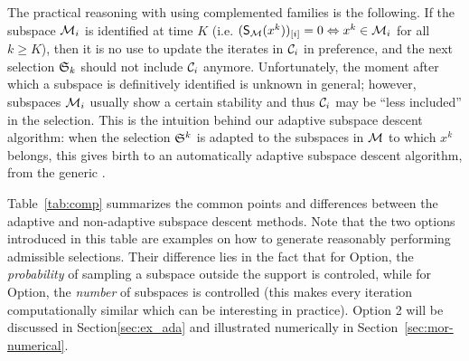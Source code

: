 \smallskip

The practical reasoning with using {complemented} families is the following. If the subspace $\mathcal{M}_i$ is identified at time $K$ (i.e. $(\mathsf{S}_{\mathcal{M}}(x^k))_{[i]}=0 \Leftrightarrow x^k\in\mathcal{M}_i$ for all $k\geq K$), then it is no use to update the iterates in $\mathcal{C}_i$ in preference, and the next selection $\mathfrak{S}_k$ should not include $\mathcal{C}_i$ anymore.
Unfortunately, the moment after which a subspace is definitively identified is unknown in general; however, subspaces $\mathcal{M}_i$ usually show a certain stability and thus $\mathcal{C}_i$ may be ``less included'' in the selection. This is the intuition behind our adaptive subspace descent algorithm: when the selection $\mathfrak{S}^k$ is adapted to the subspaces in $\mathcal{M}$ to which $x^k$ belongs, this gives birth to an automatically adaptive subspace descent algorithm, from the generic \adaalgo.

Table~\ref{tab:comp} summarizes the common points and differences between the adaptive and non-adaptive subspace descent methods. Note that the two options introduced in this table are examples on how to generate reasonably performing admissible selections. {Their difference lies in the fact that for Option, the \emph{probability} of sampling a subspace outside the support is controled, while for Option, the \emph{number} of subspaces is controlled (this makes every iteration computationally similar which can be interesting in practice). }
Option 2 will be 
discussed in Section\;\ref{sec:ex_ada} and 
illustrated numerically in Section~\ref{sec:mor-numerical}. 


